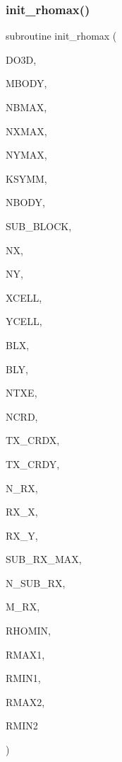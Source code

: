 \subsubsection{\texorpdfstring{init\+\_\+rhomax()}{init\_rhomax()}}
{\footnotesize\ttfamily subroutine init\+\_\+rhomax (\begin{DoxyParamCaption}\item[{integer}]{D\+O3D,  }\item[{integer}]{M\+B\+O\+DY,  }\item[{integer}]{N\+B\+M\+AX,  }\item[{integer}]{N\+X\+M\+AX,  }\item[{integer}]{N\+Y\+M\+AX,  }\item[{integer}]{K\+S\+Y\+MM,  }\item[{integer}]{N\+B\+O\+DY,  }\item[{integer, dimension(mbody)}]{S\+U\+B\+\_\+\+B\+L\+O\+CK,  }\item[{integer, dimension(nbmax,mbody)}]{NX,  }\item[{integer, dimension(nbmax,mbody)}]{NY,  }\item[{real, dimension(nxmax,nbmax,mbody)}]{X\+C\+E\+LL,  }\item[{real, dimension(nymax,nbmax,mbody)}]{Y\+C\+E\+LL,  }\item[{real, dimension(nbmax,mbody)}]{B\+LX,  }\item[{real, dimension(nbmax,mbody)}]{B\+LY,  }\item[{integer}]{N\+T\+XE,  }\item[{integer}]{N\+C\+RD,  }\item[{real, dimension(ncrd,ntxe)}]{T\+X\+\_\+\+C\+R\+DX,  }\item[{real, dimension(ncrd,ntxe)}]{T\+X\+\_\+\+C\+R\+DY,  }\item[{integer, dimension(ntxe)}]{N\+\_\+\+RX,  }\item[{real, dimension(sub\+\_\+rx\+\_\+max,m\+\_\+rx,ntxe)}]{R\+X\+\_\+X,  }\item[{real, dimension(sub\+\_\+rx\+\_\+max,m\+\_\+rx,ntxe)}]{R\+X\+\_\+Y,  }\item[{integer}]{S\+U\+B\+\_\+\+R\+X\+\_\+\+M\+AX,  }\item[{integer, dimension(m\+\_\+rx,ntxe)}]{N\+\_\+\+S\+U\+B\+\_\+\+RX,  }\item[{integer}]{M\+\_\+\+RX,  }\item[{real}]{R\+H\+O\+M\+IN,  }\item[{real}]{R\+M\+A\+X1,  }\item[{real}]{R\+M\+I\+N1,  }\item[{real}]{R\+M\+A\+X2,  }\item[{real}]{R\+M\+I\+N2 }\end{DoxyParamCaption})}

